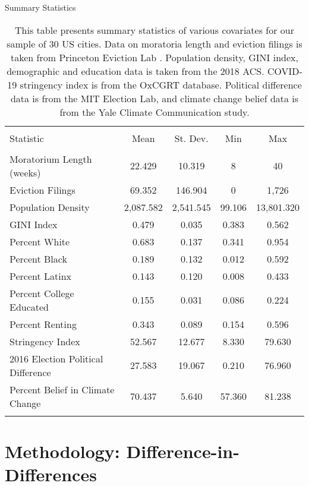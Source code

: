 \documentclass[12pt]{amsart}
\begin{document}
\begin{table}[!htbp] \centering 
  \caption{Summary Statistics} 
  \label{tab:summarystats} 
\begin{tabular}{@{\extracolsep{5pt}}lcccc} 
\\[-1.8ex]\hline 
\hline \\[-1.8ex] 
Statistic & \multicolumn{1}{c}{Mean} & \multicolumn{1}{c}{St. Dev.} & \multicolumn{1}{c}{Min} & \multicolumn{1}{c}{Max} \\ 
\hline \\[-1.8ex] 
Moratorium Length (weeks) & 22.429 & 10.319 & 8 & 40 \\ 
Eviction Filings & 69.352 & 146.904 & 0 & 1,726 \\ 
Population Density & 2,087.582 & 2,541.545 & 99.106 & 13,801.320 \\ 
GINI Index & 0.479 & 0.035 & 0.383 & 0.562 \\ 
Percent White & 0.683 & 0.137 & 0.341 & 0.954 \\ 
Percent Black & 0.189 & 0.132 & 0.012 & 0.592 \\ 
Percent Latinx & 0.143 & 0.120 & 0.008 & 0.433 \\ 
Percent College Educated & 0.155 & 0.031 & 0.086 & 0.224 \\ 
Percent Renting  & 0.343 & 0.089 & 0.154 & 0.596 \\ 
Stringency Index & 52.567 & 12.677 & 8.330 & 79.630 \\ 
2016 Election Political Difference & 27.583 & 19.067 & 0.210 & 76.960 \\ 
Percent Belief in Climate Change & 70.437 & 5.640 & 57.360 & 81.238 \\ 
\hline \\[-1.8ex] 
\end{tabular} 
\caption*{\footnotesize This table presents summary statistics of various covariates for our sample of 30 US cities. Data on moratoria length and eviction filings is taken from Princeton Eviction Lab \cite{evictionlab}. Population density, GINI index, demographic and education data is taken from the 2018 ACS. COVID-19 stringency index is from the OxCGRT database. Political difference data is from the MIT Election Lab, and climate change belief data is from the Yale Climate Communication study.}
\end{table} 

\section{Methodology: Difference-in-Differences}
\end{document}
